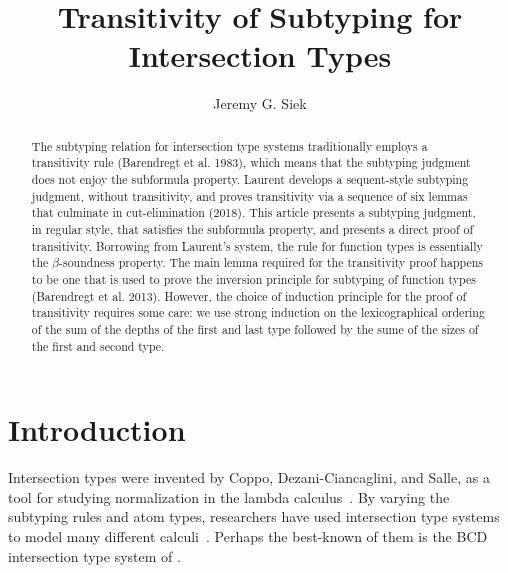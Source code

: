 \documentclass{article}
\title{Transitivity of Subtyping for Intersection Types}
\author{Jeremy G. Siek}
\begin{document}
\maketitle

\newcommand{\TOP}{\ensuremath{\mathtt{U}}}
\newcommand{\dom}[1]{\mathrm{dom}(#1)}
\newcommand{\cod}[1]{\mathrm{cod}(#1)}


\begin{abstract}
  The subtyping relation for intersection type systems traditionally
  employs a transitivity rule (Barendregt et al. 1983), which means
  that the subtyping judgment does not enjoy the subformula property.
  Laurent develops a sequent-style subtyping judgment, without
  transitivity, and proves transitivity via a sequence of six lemmas
  that culminate in cut-elimination (2018). This article presents a
  subtyping judgment, in regular style, that satisfies the subformula
  property, and presents a direct proof of transitivity. Borrowing
  from Laurent's system, the rule for function types is essentially
  the $\beta$-soundness property.  The main lemma required for the
  transitivity proof happens to be one that is used to prove the
  inversion principle for subtyping of function types (Barendregt et
  al. 2013). However, the choice of induction principle for the proof
  of transitivity requires some care: we use strong induction on the
  lexicographical ordering of the sum of the depths of the first and
  last type followed by the sume of the sizes of the first and second
  type.
\end{abstract}

\section{Introduction}

Intersection types were invented by Coppo, Dezani-Ciancaglini, and
Salle, as a tool for studying normalization in the lambda
calculus~\citep{Coppo:1979aa}. By varying the subtyping rules and atom
types, researchers have used intersection type systems to model many
different
calculi~\citep{Coppo:1980ab,Coppo:1981aa,Engeler:1981aa,Coppo:1984aa,Honsell:1992aa,Abramsky:1993fk,Plotkin:1993ab,Honsell:1999aa,Rocca:2004aa,Dezani-Ciancaglini:2005aa,Alessi:2006aa}.
Perhaps the best-known of them is the BCD intersection type system of
\citet{Barendregt:1983aa}.


\citet{Barendregt:2013aa}

\citet{Laurent:2012aa}
\citet{Laurent:2018aa}
\end{document}
